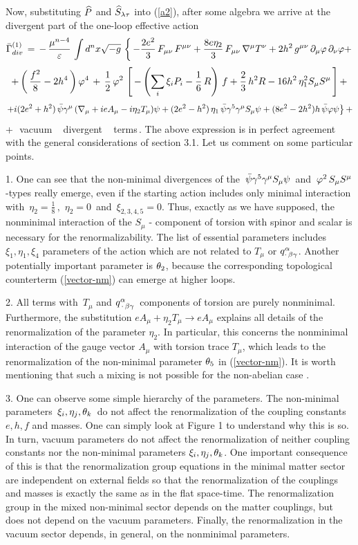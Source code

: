 \eeq
Now, substituting ${\widehat P}$ and ${\widehat S}_{\lambda\tau}$
into (\ref{a2}), after some algebra we arrive at the 
divergent part of the one-loop effective action 
$$
{\bar {\Gamma}}^{(1)}_{div} \,=\,-\,\frac{\mu^{n-4}}{\varepsilon}\,
\int d^nx\sqrt{-g}\,\left\{\,
-\frac{2e^2}{3}\,F_{\mu\nu}\,F^{\mu\nu} 
+\frac{8e\eta_2}{3}\,F_{\mu\nu}\,\nabla^\mu T^\nu + 
2h^2\,g^{\mu\nu}\,\partial_\mu\varphi\,\partial_\nu\varphi + 
\right. 
$$
$$
\left.
+ \left(\, \frac{f^2}{8} - 2h^4 \, \right)\varphi^4\,
+ \,\frac12\,\varphi^2\,\left[\,-\left(\sum_{i}\xi_iP_i
-\frac16\,R \right)\,f 
+ \frac23\,h^2R -16h^2\,\eta^2_1S_\mu S^\mu \,\right]+
\right. 
$$
$$
\left.
+ i(2e^2+h^2)\,{\bar \psi}\gamma^\mu \,
(\nabla_\mu + ieA_\mu -i\eta_2 T_\mu)\psi
+ (2e^2-h^2)\,\eta_1\,{\bar \psi}\gamma^5\gamma^\mu S_\mu\psi
+ (8e^2-2h^2)h\,{\bar \psi}\varphi\psi
\right\} + 
$$
\beq
 + \,\,{\rm vacuum \,\,\, divergent \,\,\, terms}\,.
\label{div-abel}
\eeq
\vskip 2mm
The above expression is in perfect agreement with the general 
considerations of section 3.1. 
Let us comment on some particular points. 

1. One can see that the non-minimal divergences of the 
$\,{\bar \psi}\gamma^5\gamma^\mu S_\mu\psi\,$ and 
$\,\varphi^2\,S_\mu S^\mu\,$-types really emerge, even if the
starting action includes only minimal interaction with
$\,\eta_{2}=\frac18\,,\,\,\eta_{2}=0\,$ and 
$\,\xi_{2,3,4,5} =0$. Thus, exactly as we have supposed, 
the nonminimal interaction of the $S_\mu$ - component of 
torsion with spinor and scalar is necessary for the 
renormalizability. The list of essential parameters includes 
$\xi_1, \eta_1, \xi_4$ parameters of the action which are 
not related to $T_\mu$ or $q^\alpha_{\cdot\,\beta\gamma}$. Another 
potentially important parameter is $\theta_2$, because the 
corresponding topological counterterm (\ref{vector-nm}) can 
emerge at higher loops. 

2. All terms with $\,T_\mu$ and $q^\alpha_{\,\cdot\,\beta\gamma}\,$
components of torsion are purely nonminimal. Furthermore, 
the substitution $eA_\mu + \eta_2 T_\mu \to eA_\mu$
explains all details of the renormalization of the
parameter $\eta_2$. In particular, this concerns the
nonminimal interaction of the gauge vector $A_\mu$ with 
torsion trace $T_\mu$, which leads to the renormalization 
of the non-minimal parameter $\theta_5$ in (\ref{vector-nm}).
It is worth mentioning that such a mixing is not possible 
for the non-abelian case \cite{bush1}.

3. One can observe some simple hierarchy of the parameters.
The non-minimal parameters $\,\xi_i,\eta_j,\theta_k\,$ do 
not affect the renormalization of the coupling constants 
$e,h,f$ and masses. One can simply look at Figure 1 to 
understand why this is so. In turn, vacuum parameters do 
not affect the renormalization of neither coupling constants 
nor the non-minimal parameters $\xi_i,\eta_j,\theta_k$. 
One important consequence of this is that the renormalization
group equations in the minimal matter sector are independent 
on external fields so that the renormalization of the couplings 
and masses is exactly the same as in the flat space-time.
The renormalization group in the mixed non-minimal sector
depends on the matter couplings, but does not depend
on the vacuum parameters. Finally, the renormalization  
in the vacuum sector depends, in general, on the nonminimal 
parameters. 

